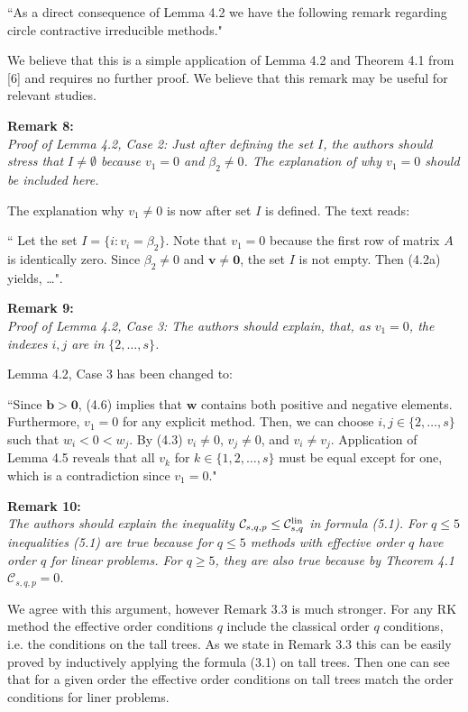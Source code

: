 \documentclass[12pt]{article}
\newcommand{\remark}[2]{\vspace{25pt} \noindent \textbf{Remark #1:\newline} \textit{#2}\vspace{15pt}}
\renewcommand{\newline}{\vspace{15pt}\\}
\newcommand{\sspcoef}{\mathcal{C}}
\newcommand{\clin}{\sspcoef^{\textnormal{lin}}_{s,q}}
\begin{document}
``As a direct consequence of Lemma 4.2 we have the following 
remark regarding circle contractive irreducible methods."

We believe that this is a simple application of Lemma 4.2 and Theorem 4.1
from [6] and requires no further proof. We believe that this remark may be useful for
relevant studies.

\remark{8}{
Proof of Lemma 4.2, Case 2: Just after defining the set $I$, the authors should stress that
$I \neq \emptyset$ because $v_1 = 0$ and $\beta_2 \neq 0$.
The explanation of why $v_1 = 0$ should be included
here.}

The explanation why $v_1 \neq 0$ is now after set $I$ is defined. The text reads:

``	Let the set $I = \{i : v_i = \beta_2\}$. 
Note that $v_1 = 0$ because the first row of matrix $A$ is identically zero.
Since $\beta_2 \neq 0$ and $ \bm{v} \neq \bm{0}$, the set $I$ is not empty.
Then (4.2a) yields, \dots".
	
\remark{9}{
Proof of Lemma 4.2, Case 3: The authors should explain, that, as $v_1 = 0$, the 
indexes $i,j$ are in $\{2,\dots,s\}$.}

Lemma 4.2, Case 3 has been changed to:

``Since $\bm{b} > \bm{0}$, (4.6) implies that $\bm{w}$ contains both positive 
and negative elements. 
Furthermore, $v_1=0$ for any explicit method.
Then, we can choose $i, j \in \{2, \dots, s\}$ such that $w_i < 0 < w_j$.
By (4.3) $v_i\ne 0$, $v_j\ne 0$, and $v_i\ne v_j$.
Application of Lemma 4.5 reveals that all $v_k$ for 
$k \in\{1,2,\dots,s\}$ must be equal except for one, which is a contradiction
since $v_1 = 0$."

\remark{10}{
The authors should explain the inequality $\sspcoef_{s,q,p} \leq \clin$ in formula (5.1). 
For $q \leq 5$ inequalities (5.1) are true because for $q \leq 5$ methods with effective 
order $q$ have order $q$ for linear problems. 
For $q \geq 5$, they are also true because by Theorem 4.1 $\sspcoef_{s,q,p}  = 0$.}

We agree with this argument, however Remark 3.3 is much stronger. For any RK method
the effective order conditions $q$ include the classical order $q$ conditions, i.e. the 
conditions on the tall trees. As we state in Remark 3.3 this can be easily proved by 
inductively applying the formula (3.1) on tall trees. Then one can see that for a given order 
the effective order conditions on tall trees match the order conditions for liner problems.
\end{document}
